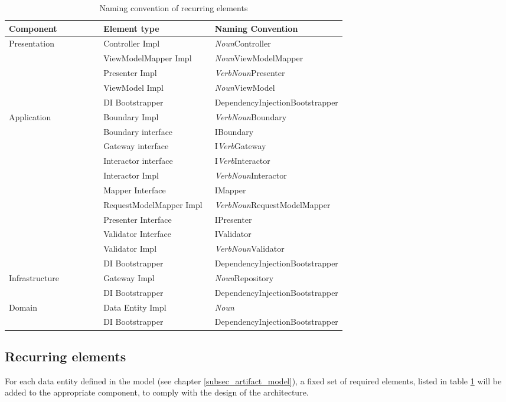     \begin{table}[h]
        \small
        \begin{tabular}{ l p{0.33\linewidth} p{0.39\linewidth} }
        \hline
        \textbf{Component} & \textbf{Element type} & \textbf{Naming Convention} \\ \hline
        Presentation & Controller Impl & \textit{Noun}Controller \\
        & ViewModelMapper Impl & \textit{Noun}ViewModelMapper \\
        & Presenter Impl & \textit{VerbNoun}Presenter \\
        & ViewModel Impl & \textit{Noun}ViewModel \\
        & DI Bootstrapper & DependencyInjectionBootstrapper \\ \hline

        Application & Boundary Impl & \textit{VerbNoun}Boundary \\
        & Boundary interface & IBoundary \\
        & Gateway interface & I\textit{Verb}Gateway \\
        & Interactor interface & I\textit{Verb}Interactor \\
        & Interactor Impl & \textit{VerbNoun}Interactor \\
        & Mapper Interface & IMapper \\
        & RequestModelMapper Impl & \textit{VerbNoun}RequestModelMapper \\
        & Presenter Interface & IPresenter \\
        & Validator Interface & IValidator \\
        & Validator Impl & \textit{VerbNoun}Validator \\
        & DI Bootstrapper & DependencyInjectionBootstrapper \\ \hline
        
        Infrastructure & Gateway Impl & \textit{Noun}Repository \\
        & DI Bootstrapper & DependencyInjectionBootstrapper \\ \hline

        Domain & Data Entity Impl & \textit{Noun} \\
        & DI Bootstrapper & DependencyInjectionBootstrapper \\ \hline
        \end{tabular}
        \caption{Naming convention of recurring elements}
        \label{table:element_naming_convention}
        \end{table}

    \subsection{Recurring elements}
    
    For each data entity defined in the model (see chapter \ref{subsec_artifact_model}), a
    fixed set of required elements, listed in table \ref{table:element_naming_convention}
    will be added to the appropriate component, to comply with the design of the
    architecture.

